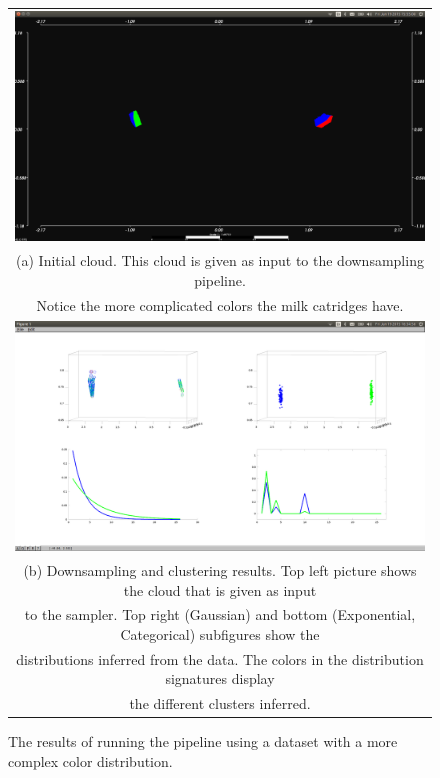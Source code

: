 \documentclass [twoside,hidelinks]{article}
\begin{document}
\begin{figure}
\begin{tabular}{c}
  \includegraphics [width=1\textwidth]{clusterings/coloursSource} \\
   (a) Initial cloud. This cloud is given as input to the downsampling pipeline.    \\
   Notice the more complicated colors the milk catridges have. \\
   \includegraphics [width=1\textwidth]{clusterings/coloursCorrect} \\
  (b) Downsampling and clustering results. Top left picture shows the cloud that is given as input\\
 to the sampler. Top right (Gaussian) and bottom (Exponential, Categorical) subfigures show the \\
 distributions inferred from the data. The colors in the distribution signatures display \\
 the different clusters inferred.\end{tabular}
\caption{The results of running the pipeline using a dataset with a more complex color distribution.}
  \label{pcl:clust2}
\end{figure}
\end{document}
